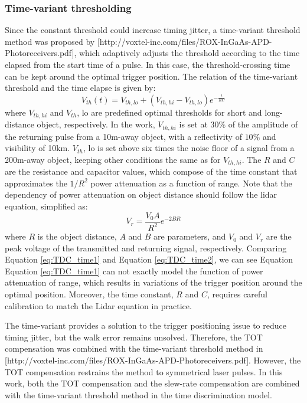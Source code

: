 \subsubsection{Time-variant thresholding}
Since the constant threshold could increase timing jitter, a time-variant threshold method was proposed by [http://voxtel-inc.com/files/ROX-InGaAs-APD-Photoreceivers.pdf], which adaptively adjusts the threshold according to the time elapsed from the start time of a pulse. In this case, the threshold-crossing time can be kept around the optimal trigger position. The relation of the time-variant threshold and the time elapse is given by: 
\begin{equation}\label{eq:TDC_time1}
    V_{th}(t)=V_{th,lo}+(V_{th,hi}-V_{th,lo})e^{-\frac{t}{RC}}
\end{equation}
where $V_{th, hi}$ and $V_{th}$, lo are predefined optimal thresholds for short and long-distance object, respectively. In the work, $V_{th, hi}$ is set at $30\%$ of the amplitude of the returning pulse from a 10m-away object, with a reflectivity of $10\%$ and visibility of 10km. $V_{th}$, lo is set above six times the noise floor of a signal from a 200m-away object, keeping other conditions the same as for $V_{th, hi}$. The $R$ and $C$ are the resistance and capacitor values, which compose of the time constant that approximates the $1/R^2$ power attenuation as a function of range. Note that the dependency of power attenuation on object distance should follow the lidar equation, simplified as: 
\begin{equation}\label{eq:TDC_time2}
    V_r=\frac{V_0A}{R^2}e^{-2BR}
\end{equation}
where $R$ is the object distance, $A$ and $B$ are parameters, and $V_0$ and $V_r$ are the peak voltage of the transmitted and returning signal, respectively. Comparing Equation \eqref{eq:TDC_time1} and Equation \eqref{eq:TDC_time2}, we can see Equation Equation \eqref{eq:TDC_time1} can not exactly model the function of power attenuation of range, which results in variations of the trigger position around the optimal position. Moreover, the time constant, $R$ and $C$, requires careful calibration to match the Lidar equation in practice.\par
The time-variant provides a solution to the trigger positioning issue to reduce timing jitter, but the walk error remains unsolved. Therefore, the TOT compensation was combined with the time-variant threshold method in [http://voxtel-inc.com/files/ROX-InGaAs-APD-Photoreceivers.pdf]. However, the TOT compensation restrains the method to symmetrical laser pulses. In this work, both the TOT compensation and the slew-rate compensation are combined with the time-variant threshold method in the time discrimination model.
